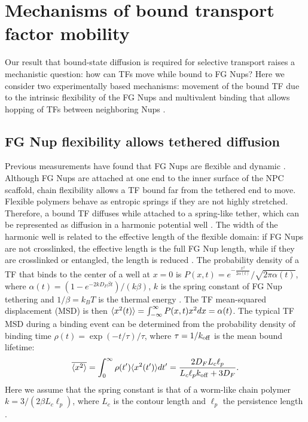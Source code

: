 \section{Mechanisms of  bound transport factor mobility}

Our result that bound-state diffusion is required for selective transport raises a mechanistic question: how can TFs move while bound to FG Nups? Here we consider two experimentally based mechanisms: movement of the bound TF due to the intrinsic flexibility of the FG Nups \cite{patel07} and multivalent binding that allows hopping of TFs between neighboring Nups \cite{raveh16}.

\subsection{FG Nup flexibility allows tethered diffusion}
Previous measurements have found that FG Nups are flexible and dynamic \cite{lim07, milles14, hough15}. Although FG Nups are attached at one end to the inner surface of the NPC scaffold, chain flexibility allows a TF bound far from the tethered end to move.  Flexible polymers behave as entropic springs \cite{howard01} if they are not highly stretched. Therefore, a bound TF diffuses while attached to a spring-like tether, which can be represented as diffusion in a
harmonic potential well .  The width of the harmonic well is related to the effective length of the flexible domain: if FG Nups are not crosslinked, the effective length is the full FG Nup length, while if they are crosslinked or entangled, the length is reduced \cite{ribbeck01}.  The probability density of a TF that binds to the center of a well at $x=0$ is $P(x,t) = e^{-\frac{x^2}{2 \alpha(t)}}/\sqrt{2\pi \alpha(t)}$, where $ \alpha(t) = (1-e^{-2kD_F\beta t})/(k\beta)$, $k$ is the spring constant of FG Nup tethering and $1/\beta = k_BT$ is the thermal energy \cite{cau12}.  The TF mean-squared displacement (MSD) is then $\langle x^2(t) \rangle = \int_{-\infty}^{\infty} P(x,t) x^2 dx = \alpha(t)$. The typical TF MSD during a binding event can be determined from the probability density of binding time $\rho (t) = \exp(-t/\tau)/\tau$, where $\tau = 1/k_{\rm off}$ is the mean bound lifetime:
\begin{equation}\label{eq:sho}
  \overline{\langle x^2 \rangle} = \int_0^{\infty} \rho(t') \langle x^2(t') \rangle dt' = \frac{2D_F L_c
    \ell_p}{L_c \ell_p k_{\rm off}+ 3D_F}. 
\end{equation} 
Here we assume that the spring constant is that of a worm-like chain polymer $k = 3/(2\beta L_c \ell_p)$, where $L_c$ is the contour length and $\ell_p$ the persistence length \cite{howard01}.


